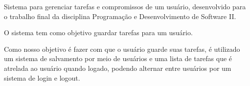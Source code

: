 Sistema para gerenciar tarefas e compromissos de um usuário, desenvolvido para o trabalho final da disciplina Programação e Desenvolvimento de Software II.

O sistema tem como objetivo guardar tarefas para um usuário.

Como nosso objetivo é fazer com que o usuário guarde suas tarefas, é utilizado um sistema de salvamento por meio de usuários e uma lista de tarefas que é atrelada ao usuário quando logado, podendo alternar entre usuários por um sistema de login e logout. 